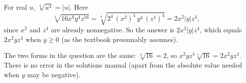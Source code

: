 For real $u$, $\sqrt[4]{u^4}=|u|$. Here
\[
\sqrt[4]{16x^8y^4z^{16}}=\sqrt[4]{2^4\,(x^2)^4\,y^4\,(z^4)^4}=2x^2|y|z^4,
\]
since $x^2$ and $z^4$ are already nonnegative. So the answer is $\boxed{2x^2|y|z^4}$, which equals $2x^2yz^4$ when $y\ge0$ (as the textbook presumably assumes).

The two forms in the question are the same: $\sqrt[4]{16}=2$, so $x^2yz^4\sqrt[4]{16}=2x^2yz^4$. There is no error in the solutions manual (apart from the absolute value needed when $y$ may be negative).

